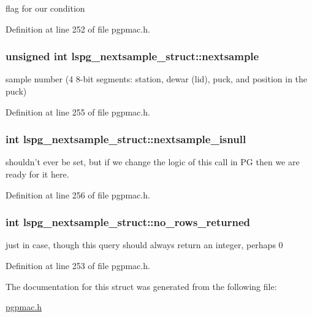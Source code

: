 flag for our condition 



Definition at line 252 of file pgpmac.\-h.

\hypertarget{structlspg__nextsample__struct_aecd82b329462ae06bc2f0d162985a086}{
\subsubsection[{nextsample}]{\setlength{\rightskip}{0pt plus 5cm}unsigned int lspg\-\_\-nextsample\-\_\-struct\-::nextsample}}\label{structlspg__nextsample__struct_aecd82b329462ae06bc2f0d162985a086}


sample number (4 8-\/bit segments\-: station, dewar (lid), puck, and position in the puck) 



Definition at line 255 of file pgpmac.\-h.

\hypertarget{structlspg__nextsample__struct_a2ca6e2a667c9fe7f1a54329de04d2a3c}{
\subsubsection[{nextsample\-\_\-isnull}]{\setlength{\rightskip}{0pt plus 5cm}int lspg\-\_\-nextsample\-\_\-struct\-::nextsample\-\_\-isnull}}\label{structlspg__nextsample__struct_a2ca6e2a667c9fe7f1a54329de04d2a3c}


shouldn't ever be set, but if we change the logic of this call in P\-G then we are ready for it here. 



Definition at line 256 of file pgpmac.\-h.

\hypertarget{structlspg__nextsample__struct_aeee8110133db9f1895237ed9b54dd873}{
\subsubsection[{no\-\_\-rows\-\_\-returned}]{\setlength{\rightskip}{0pt plus 5cm}int lspg\-\_\-nextsample\-\_\-struct\-::no\-\_\-rows\-\_\-returned}}\label{structlspg__nextsample__struct_aeee8110133db9f1895237ed9b54dd873}


just in case, though this query should always return an integer, perhaps 0 



Definition at line 253 of file pgpmac.\-h.



The documentation for this struct was generated from the following file\-:\begin{DoxyCompactItemize}
\item 
\hyperlink{pgpmac_8h}{pgpmac.\-h}\end{DoxyCompactItemize}
